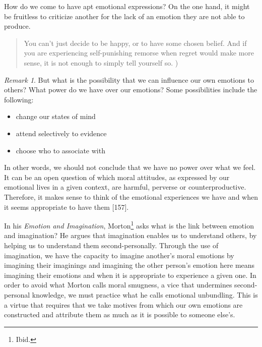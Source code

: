\documentclass[phdthesis,12pt,final,a4paper]{wuthesis}
\theoremstyle{definition}
\theoremstyle{definition}
\theoremstyle{definition}
\theoremstyle{definition}
\theoremstyle{remark}
\newtheorem*{remark}{Remark}
\begin{document}
How do we come to have apt emotional expressions? On the one hand, it might be fruitless to criticize another for the lack of an emotion they are not able to produce.

\begin{quote}
You can't just decide to be happy, or to have some chosen belief. And if you are experiencing self-punishing remorse when regret would make more sense, it is not enough to simply tell yourself so. )
\end{quote}

\begin{remark}

But what is the possibility that we can influence our own emotions to others? What power do we have over our emotions? Some possibilities include the following:

\begin{itemize}
\tightlist
\item
  change our states of mind
\item
  attend selectively to evidence
\item
  choose who to associate with
\end{itemize}

\end{remark}

In other words, we should not conclude that we have no power over what we feel. It can be an open question of which moral attitudes, as expressed by our emotional lives in a given context, are harmful, perverse or counterproductive. Therefore, it makes sense to think of the emotional experiences we have and when it seems appropriate to have them {[}157{]}.

In his \emph{Emotion and Imagination}, Morton\footnote{Ibid.} asks what is the link between emotion and imagination? He argues that imagination enables us to understand others, by helping us to understand them second-personally. Through the use of imagination, we have the capacity to imagine another's moral emotions by imagining their imaginings and imagining the other person's emotion here means imagining their emotions and when it is appropriate to experience a given one. In order to avoid what Morton calls moral smugness, a vice that undermines second-personal knowledge, we must practice what he calls emotional unbundling. This is a virtue that requires that we take motives from which our own emotions are constructed and attribute them as much as it is possible to someone else's.
\end{document}
